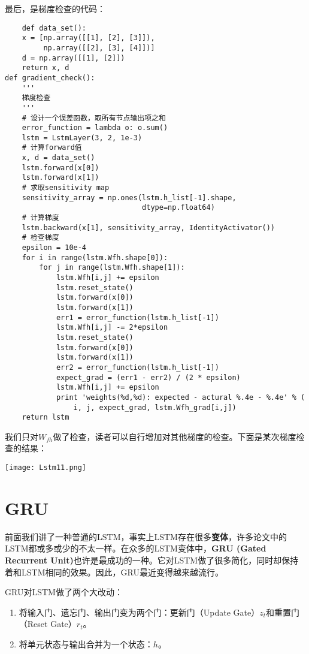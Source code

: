最后，是梯度检查的代码：
\begin{lstlisting}
    def data_set():
    x = [np.array([[1], [2], [3]]),
         np.array([[2], [3], [4]])]
    d = np.array([[1], [2]])
    return x, d
def gradient_check():
    '''
    梯度检查
    '''
    # 设计一个误差函数，取所有节点输出项之和
    error_function = lambda o: o.sum()
    lstm = LstmLayer(3, 2, 1e-3)
    # 计算forward值
    x, d = data_set()
    lstm.forward(x[0])
    lstm.forward(x[1])
    # 求取sensitivity map
    sensitivity_array = np.ones(lstm.h_list[-1].shape,
                                dtype=np.float64)
    # 计算梯度
    lstm.backward(x[1], sensitivity_array, IdentityActivator())
    # 检查梯度
    epsilon = 10e-4
    for i in range(lstm.Wfh.shape[0]):
        for j in range(lstm.Wfh.shape[1]):
            lstm.Wfh[i,j] += epsilon
            lstm.reset_state()
            lstm.forward(x[0])
            lstm.forward(x[1])
            err1 = error_function(lstm.h_list[-1])
            lstm.Wfh[i,j] -= 2*epsilon
            lstm.reset_state()
            lstm.forward(x[0])
            lstm.forward(x[1])
            err2 = error_function(lstm.h_list[-1])
            expect_grad = (err1 - err2) / (2 * epsilon)
            lstm.Wfh[i,j] += epsilon
            print 'weights(%d,%d): expected - actural %.4e - %.4e' % (
                i, j, expect_grad, lstm.Wfh_grad[i,j])
    return lstm
\end{lstlisting}


我们只对\(W_{fh}\)做了检查，读者可以自行增加对其他梯度的检查。下面是某次梯度检查的结果：

\texttt{[image: Lstm11.png]}


\section{GRU}\label{Lstm:16}

前面我们讲了一种普通的LSTM，事实上LSTM存在很多\textbf{变体}，许多论文中的LSTM都或多或少的不太一样。在众多的LSTM变体中，\textbf{GRU (Gated Recurrent Unit)}也许是最成功的一种。它对LSTM做了很多简化，同时却保持着和LSTM相同的效果。因此，GRU最近变得越来越流行。

GRU对LSTM做了两个大改动：

\begin{enumerate}
	\item
	      将输入门、遗忘门、输出门变为两个门：更新门（Update Gate）\({z}_t\)和重置门（Reset Gate）\({r}_t\)。
	\item
	      将单元状态与输出合并为一个状态：\({h}\)。
\end{enumerate}

